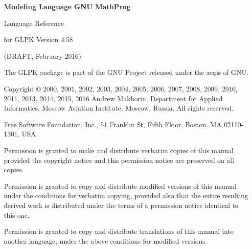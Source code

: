 \documentclass[11pt]{report}
\begin{document}
\thispagestyle{empty}

\begin{center}

\vspace*{1.5in}

\begin{huge}
\sf\bfseries Modeling Language GNU MathProg
\end{huge}

\vspace{0.5in}

\begin{LARGE}
\sf Language Reference
\end{LARGE}

\vspace{0.5in}

\begin{LARGE}
\sf for GLPK Version 4.58
\end{LARGE}

\vspace{0.5in}
\begin{Large}
\sf (DRAFT, February 2016)
\end{Large}

\end{center}

\newpage

\vspace*{1in}

\vfill

\noindent
The GLPK package is part of the GNU Project released under the aegis of
GNU.

\noindent
Copyright \copyright{} 2000, 2001, 2002, 2003, 2004, 2005, 2006, 2007,
2008, 2009, 2010, 2011, 2013, 2014, 2015, 2016 Andrew Makhorin,
Department for Applied Informatics, Moscow Aviation Institute, Moscow,
Russia. All rights reserved.

\noindent
Free Software Foundation, Inc., 51 Franklin St, Fifth Floor, Boston,
MA 02110-1301, USA.

\noindent
Permission is granted to make and distribute verbatim copies of this
manual provided the copyright notice and this permission notice are
preserved on all copies.

\noindent
Permission is granted to copy and distribute modified versions of this
manual under the conditions for verbatim copying, provided also that
the entire resulting derived work is distributed under the terms of
a permission notice identical to this one.

\noindent
Permission is granted to copy and distribute translations of this
manual into another language, under the above conditions for modified
versions.
\end{document}
